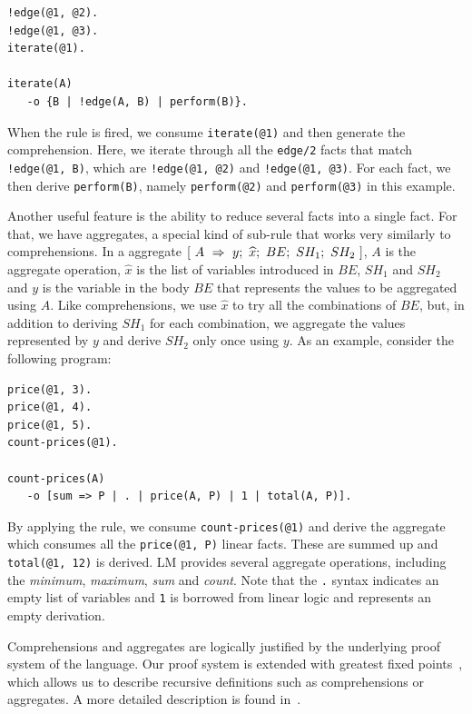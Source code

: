 \documentclass{sigplanconf}
\begin{document}
{\footnotesize
\begin{Verbatim}
!edge(@1, @2).
!edge(@1, @3).
iterate(@1).

iterate(A)
   -o {B | !edge(A, B) | perform(B)}.
\end{Verbatim}
}

When the rule is fired, we consume \texttt{iterate(@1)} and then
generate the comprehension. Here, we iterate through all the
\texttt{edge/2} facts that match \texttt{!edge(@1, B)}, which are
\texttt{!edge(@1, @2)} and \texttt{!edge(@1, @3)}. For each fact, we
then derive \texttt{perform(B)}, namely \texttt{perform(@2)} and
\texttt{perform(@3)} in this example.

Another useful feature is the ability to reduce several facts into a
single fact. For that, we have aggregates, a special kind of sub-rule
that works very similarly to comprehensions. In a aggregate
$[~A~\Rightarrow~y;~\widehat{x};~BE;~SH_1;~SH_2~]$, $A$ is the aggregate operation, $\widehat{x}$ is the
list of variables introduced in $BE$, $SH_1$ and $SH_2$ and $y$ is the
variable in the body $BE$ that represents the values to be aggregated
using $A$. Like comprehensions, we use $\widehat{x}$ to try all the
combinations of $BE$, but, in addition to deriving $SH_1$ for each
combination, we aggregate the values represented by $y$ and derive
$SH_2$ only once using $y$. As an example, consider the following
program:

{\footnotesize
\begin{Verbatim}
price(@1, 3).
price(@1, 4).
price(@1, 5).
count-prices(@1).

count-prices(A)
   -o [sum => P | . | price(A, P) | 1 | total(A, P)].
\end{Verbatim}
}

By applying the rule, we consume \texttt{count-prices(@1)} and derive
the aggregate which consumes all the \texttt{price(@1, P)} linear
facts. These are summed up and \texttt{total(@1,~12)} is derived. LM
provides several aggregate operations, including the \emph{minimum},
\emph{maximum}, \emph{sum} and \emph{count}. Note that the \texttt{.} syntax indicates
an empty list of variables and \texttt{1} is borrowed from linear logic
and represents an empty derivation.

Comprehensions and aggregates are logically justified by the underlying
proof system of the language. Our proof system is extended with greatest
fixed points~\cite{Baelde:2012:LGF:2071368.2071370}, which allows us to describe
recursive definitions such as comprehensions or aggregates.
A more detailed description is found in~\cite{cruz-iclp14}.
\end{document}
